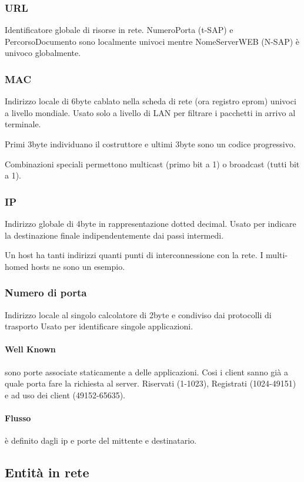 \subsubsection{URL}
Identificatore globale di risorse in rete.
\rettangolo{[ProtocolloApplicativo]://[NomeServerWEB]:[NumeroPorta]/[PercorsoDocumento]}
NumeroPorta (t-SAP) e PercorsoDocumento sono localmente univoci mentre NomeServerWEB (N-SAP) è univoco globalmente.
\subsubsection{MAC}
Indirizzo locale di 6byte cablato nella scheda di rete (ora registro eprom) univoci a livello mondiale. Usato solo a livello di LAN per filtrare i pacchetti in arrivo al terminale.

Primi 3byte individuano il costruttore e ultimi 3byte sono un codice progressivo.

Combinazioni speciali permettono multicast (primo bit a 1) o broadcast (tutti bit a 1).
\subsubsection{IP}
Indirizzo globale di 4byte in rappresentazione dotted decimal. Usato per indicare la destinazione finale indipendentemente dai passi intermedi.

Un host ha tanti indirizzi quanti punti di interconnessione con la rete. I multi-homed hosts ne sono un esempio.
\subsubsection{Numero di porta}
Indirizzo locale al singolo calcolatore di 2byte e condiviso dai protocolli di trasporto Usato per identificare singole applicazioni.
\paragraph{Well Known} sono porte associate staticamente a delle applicazioni. Cosi i client sanno già a quale porta fare la richiesta al server.
Riservati (1-1023), Registrati (1024-49151) e ad uso dei client (49152-65635).
\paragraph{Flusso} è definito dagli ip e porte del mittente e destinatario.
\subsection{Entità in rete}
